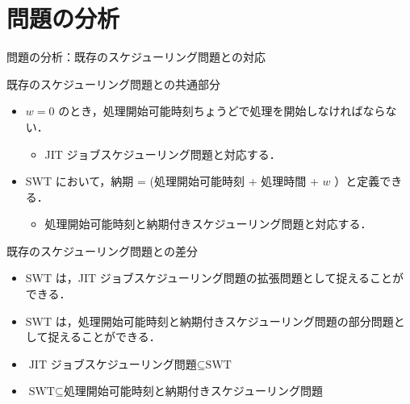 \documentclass[dvipdfmx]{beamer}
\begin{document}
    \section{問題の分析}
    \begin{frame}{問題の分析：既存のスケジューリング問題との対応}
      \begin{block}{既存のスケジューリング問題との共通部分}
        \begin{itemize}
          \item {$w = 0$ のとき，処理開始可能時刻ちょうどで処理を開始しなければならない．}
          \begin{itemize}
            \item {\alert{JIT ジョブスケジューリング問題}と対応する．}
          \end{itemize}
          \item {SWT において，納期 = (処理開始可能時刻 + 処理時間 + $w$ ）と定義できる．}
          \begin{itemize}
            \item {\alert{処理開始可能時刻と納期付きスケジューリング問題}と対応する．}
          \end{itemize}
        \end{itemize}
      \end{block}
      \begin{block}{既存のスケジューリング問題との差分}
        \begin{itemize}
          \item {SWT は，JIT ジョブスケジューリング問題の\alert{拡張問題}として捉えることができる．}
          \item {SWT は，処理開始可能時刻と納期付きスケジューリング問題の\alert{部分問題}として捉えることができる．}
        \end{itemize}
      \end{block}
      \begin{itemize}
        \item ${\mbox {JIT ジョブスケジューリング問題}} \subseteq {\mbox {SWT}}$
        \item ${\mbox {SWT}} \subseteq {\mbox {処理開始可能時刻と納期付きスケジューリング問題}}$
      \end{itemize}
    \end{frame}
\end{document}
